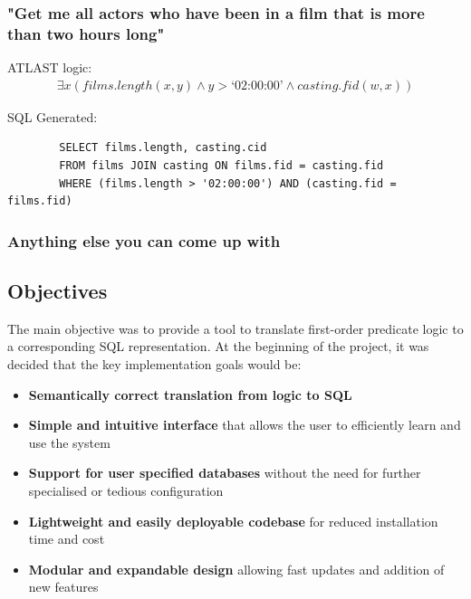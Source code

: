 \documentclass[a4paper, 11pt]{article}
\begin{document}
    \subsubsection*{"Get me all actors who have been in a film that is more
      than two hours long"}

      ATLAST logic:
      \begin{gather}
        \exists x(films.length(x, y) \land y > \text{`02:00:00'} \land
          casting.fid(w, x))
      \end{gather}

      SQL Generated:
      \begin{verbatim}
        SELECT films.length, casting.cid
        FROM films JOIN casting ON films.fid = casting.fid
        WHERE (films.length > '02:00:00') AND (casting.fid = films.fid)
      \end{verbatim}

    \subsubsection{Anything else you can come up with}

  \subsection{Objectives}
    The main objective was to provide a tool to translate first-order predicate
    logic to a corresponding SQL representation. At the beginning of the
    project, it was decided that the key implementation goals would be:

    \begin{itemize}
      \item \textbf{Semantically correct translation from logic to SQL}

      \item \textbf{Simple and intuitive interface} that allows the user to
      efficiently learn and use the system

      \item \textbf{Support for user specified databases} without the need for
      further specialised or tedious configuration

      \item \textbf{Lightweight and easily deployable codebase} for reduced
      installation time and cost

      \item \textbf{Modular and expandable design} allowing fast updates and
      addition of new features
    \end{itemize}
\end{document}
